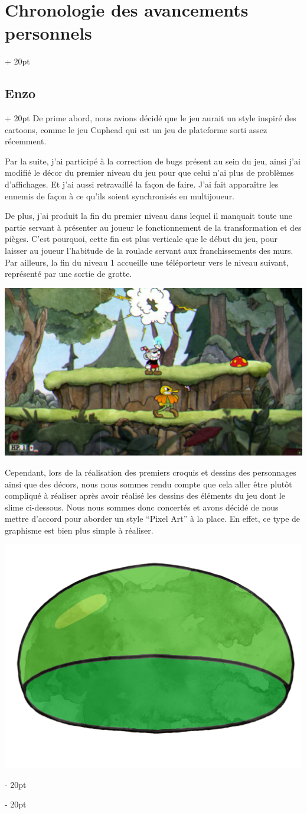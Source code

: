 \documentclass[a4paper, 12pt, twoside]{article}
\newcommand{\ind}[1][20pt]{\advance\leftskip + #1}
\newcommand{\deind}[1][20pt]{\advance\leftskip - #1}
\newenvironment{indt}[2][20pt]{#2 \par \ind[#1]}{\par \deind} %
\begin{document}
\begin{indt}{\section{Chronologie des avancements personnels}}
\begin{indt}{\subsection{Enzo}}
            De prime abord, nous avions décidé que le jeu aurait un style inspiré des cartoons, comme le jeu Cuphead qui est un jeu de plateforme sorti assez récemment.
            
            Par la suite, j’ai participé à la correction de bugs présent au sein du jeu, ainsi j’ai modifié le décor du premier niveau du jeu pour que celui n’ai plus de problèmes d’affichages. Et j’ai aussi retravaillé la façon de faire. J’ai fait apparaître les ennemis de façon à ce qu’ils soient synchronisés en multijoueur.

            De plus, j’ai produit la fin du premier niveau dans lequel il manquait toute une partie servant à présenter au joueur le fonctionnement de la transformation et des pièges. C’est pourquoi, cette fin est plus verticale que le début du jeu, pour laisser au joueur l’habitude de la roulade servant aux franchissements des murs. Par ailleurs, la fin du niveau 1 accueille une téléporteur vers le niveau suivant, représenté par une sortie de grotte.

            \begin{center}
                \includegraphics[width=0.8\linewidth]{Cuphead.png}
            \end{center}

            Cependant, lors de la réalisation des premiers croquis et dessins des personnages ainsi que des décors, nous nous sommes rendu compte que cela aller être plutôt compliqué à réaliser après avoir réalisé les dessins des éléments du jeu dont le slime ci-dessous. Nous nous sommes donc concertés et avons décidé de nous mettre d'accord pour aborder un style “Pixel Art” à la place. En effet, ce type de graphisme est bien plus simple à réaliser.

            \begin{center}
                \includegraphics[width=0.2\linewidth]{Slime.jpg}
            \end{center}


\end{indt}
\end{indt}
\end{document}

